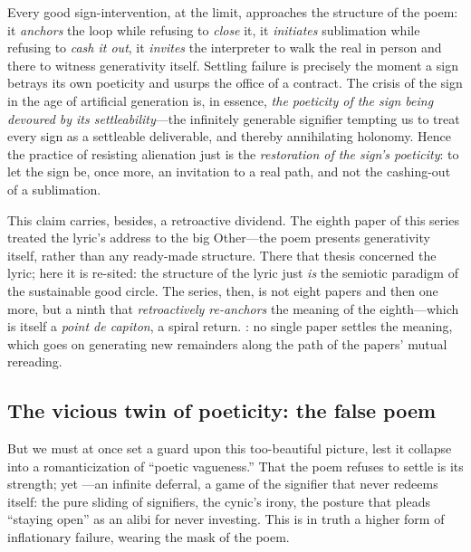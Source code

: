 \begin{claim}
Every good sign-intervention, at the limit, approaches the structure of the poem: it \emph{anchors} the loop while refusing to \emph{close} it, it \emph{initiates} sublimation while refusing to \emph{cash it out}, it \emph{invites} the interpreter to walk the real in person and there to witness generativity itself. Settling failure is precisely the moment a sign betrays its own poeticity and usurps the office of a contract. The crisis of the sign in the age of artificial generation is, in essence, \emph{the poeticity of the sign being devoured by its settleability}---the infinitely generable signifier tempting us to treat every sign as a settleable deliverable, and thereby annihilating holonomy. Hence the practice of resisting alienation just is the \emph{restoration of the sign's poeticity}: to let the sign be, once more, an invitation to a real path, and not the cashing-out of a sublimation.
\end{claim}

This claim carries, besides, a retroactive dividend. The eighth paper of this series treated the lyric's address to the big Other---the poem presents generativity itself, rather than any ready-made structure. There that thesis concerned the lyric; here it is re-sited: the structure of the lyric just \emph{is} the semiotic paradigm of the sustainable good circle. The series, then, is not eight papers and then one more, but a ninth that \emph{retroactively re-anchors} the meaning of the eighth---which is itself a \emph{point de capiton}, a spiral return. : no single paper settles the meaning, which goes on generating new remainders along the path of the papers' mutual rereading.

\subsection{The vicious twin of poeticity: the false poem}
\label{p09:sec:false-poem}

But we must at once set a guard upon this too-beautiful picture, lest it collapse into a romanticization of ``poetic vagueness.'' That the poem refuses to settle is its strength; yet ---an infinite deferral, a game of the signifier that never redeems itself: the pure sliding of signifiers, the cynic's irony, the posture that pleads ``staying open'' as an alibi for never investing. This is in truth a higher form of inflationary failure, wearing the mask of the poem.

